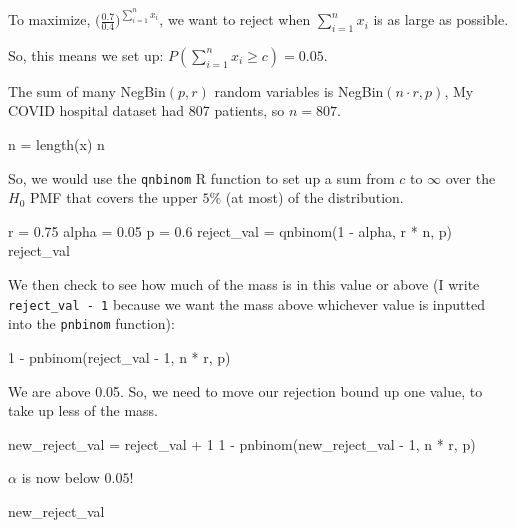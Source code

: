 \documentclass[
  letterpaper,
  DIV=11,
  numbers=noendperiod]{scrreprt}
\newenvironment{Shaded}{\begin{snugshade}}{\end{snugshade}}
\newcommand{\NormalTok}[1]{\textcolor[rgb]{0.00,0.23,0.31}{#1}}
\begin{document}
To maximize, \(\Big(\frac{0.7}{0.4}\Big)^{\sum_{i=1}^n x_i}\), we want
to reject when \(\sum_{i=1}^n x_i\) is as large as possible.

So, this means we set up: \(P(\sum_{i=1}^n x_i \geq c) = 0.05\).

The sum of many NegBin\((p, r)\) random variables is
NegBin\((n \cdot r, p)\), My COVID hospital dataset had 807 patients, so
\(n = 807\).

\begin{Shaded}
\begin{Highlighting}[]
\NormalTok{n = length(x)}
\NormalTok{n}
\end{Highlighting}
\end{Shaded}

So, we would use the \texttt{qnbinom} R function to set up a sum from
\(c\) to \(\infty\) over the \(H_0\) PMF that covers the upper \(5\%\)
(at most) of the distribution.

\begin{Shaded}
\begin{Highlighting}[]
\NormalTok{r = 0.75}
\NormalTok{alpha = 0.05}
\NormalTok{p = 0.6}
\NormalTok{reject\_val = qnbinom(1 {-} alpha, r * n, p)}
\NormalTok{reject\_val}
\end{Highlighting}
\end{Shaded}

We then check to see how much of the mass is in this value or above (I
write \texttt{reject\_val\ -\ 1} because we want the mass above
whichever value is inputted into the \texttt{pnbinom} function):

\begin{Shaded}
\begin{Highlighting}[]
\NormalTok{1 {-} pnbinom(reject\_val {-} 1, n * r, p)}
\end{Highlighting}
\end{Shaded}

We are above 0.05. So, we need to move our rejection bound up one value,
to take up less of the mass.

\begin{Shaded}
\begin{Highlighting}[]
\NormalTok{new\_reject\_val = reject\_val + 1}
\NormalTok{1 {-} pnbinom(new\_reject\_val {-} 1, n * r, p)}
\end{Highlighting}
\end{Shaded}

\(\alpha\) is now below \(0.05\)!

\begin{Shaded}
\begin{Highlighting}[]
\NormalTok{new\_reject\_val}
\end{Highlighting}
\end{Shaded}
\end{document}
